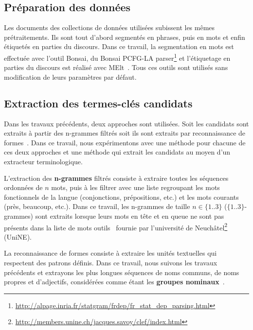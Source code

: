   \subsection{Préparation des données}
  \label{subsec:preparation_des_donnees}
    Les documents des collections de données utilisées subissent les mêmes
    prétraitements. Ils sont tout d'abord segmentés en phrases, puis en mots et
    enfin étiquetés en parties du discours. Dans ce travail, la segmentation en
    mots est effectuée avec l'outil Bonsai, du Bonsai PCFG-LA
    parser\footnote{\url{http://alpage.inria.fr/statgram/frdep/fr_stat_dep_parsing.html}}
    et l'étiquetage en parties du discours est réalisé avec
    MElt~\cite{denis2009melt}. Tous ces outils sont utilisés sans modification
    de leurs paramètres par défaut.

  \subsection{Extraction des termes-clés candidats}
  \label{subsec:extraction_de_termes_cles_candidats}
    Dans les travaux précédents, deux approches sont utilisées. Soit les
    candidats sont extraits à partir des n-grammes filtrés soit ils sont
    extraits par reconnaissance de formes~\cite{hulth2003keywordextraction}.
    Dans ce travail, nous expérimentons avec une méthode pour chacune de ces
    deux approches et une méthode qui extrait les candidats au moyen d'un
    extracteur terminologique.

    L'extraction des \textbf{n-grammes} filtrés consiste à extraire toutes les
    séquences ordonnées de $n$ mots, puis à les filtrer avec une liste
    regroupant les mots fonctionnels de la langue (conjonctions, prépositions,
    etc.) et les mots courants (\og{}près\fg{}, \og{}beaucoup\fg{}, etc.). Dans
    ce travail, les n-grammes de taille $n \in \{1..3\}$ ($\{1..3\}$-grammes)
    sont extraits lorsque leurs mots en tête et en queue ne sont pas présents
    dans la liste de mots outils~\cite{witten1999kea} fournie par l'université
    de
    Neuchâtel\footnote{\url{http://members.unine.ch/jacques.savoy/clef/index.html}}
    (UniNE).

    La reconnaissance de formes consiste à extraire les unités textuelles qui
    respectent des patrons définis. Dans ce travail, nous suivons les travaux
    précédents et extrayons les plus longues séquences de noms communs, de noms
    propres et d'adjectifs, considérées comme étant les \textbf{groupes
    nominaux}~\cite{hassan2010conundrums}.

